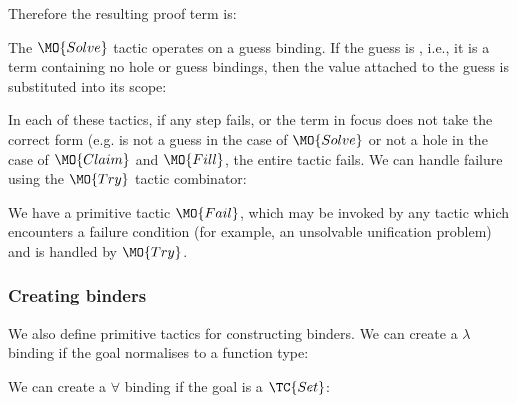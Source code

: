 \noindent
Therefore the resulting proof term is:


The $\MO{Solve}$ tactic operates on a guess binding. If the guess is , i.e., it
is a \TT{} term containing no hole or guess bindings, then the value attached to
the guess is substituted into its scope:


In each of these tactics, if any step fails, or the term in focus does not take
the correct form (e.g. is not a guess in the case of $\MO{Solve}$ or not a hole
in the case of $\MO{Claim}$ and $\MO{Fill}$, the entire tactic fails. We can
handle failure using the $\MO{Try}$ tactic combinator:


We have a primitive tactic $\MO{Fail}$, which may be invoked by
any tactic which encounters a failure condition (for example, an unsolvable unification
problem) and is handled by $\MO{Try}$.

\subsubsection{Creating binders}

We also define primitive tactics for constructing binders. We can create a $\lambda$
binding if the goal normalises to a function type:


\noindent
We can create a $\forall$ binding if the goal is a $\TC{Set}$:


